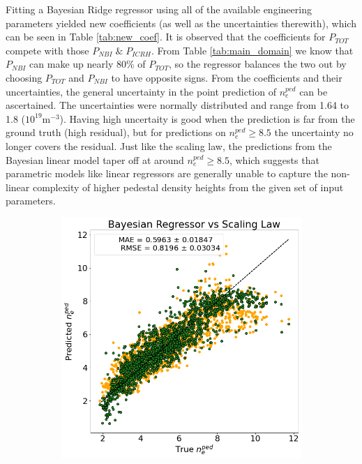 \documentclass[a4paper, twoside, final, 12pt]{article}
\begin{document}
{Fitting a Bayesian Ridge regressor using all of the available engineering parameters yielded new coefficients (as well as the uncertainties therewith), which can be seen in Table \ref{tab:new_coef}. It is observed that the coefficients for $P_{TOT}$ compete with those $P_{NBI} \; \& \; P_{ICRH}$. From Table \ref{tab:main_domain} we know that $P_{NBI}$ can make up nearly 80\% of $P_{TOT}$, so the regressor balances the two out by choosing $P_{TOT}$ and $P_{NBI}$ to have opposite signs.     
From the coefficients and their uncertainties, the general uncertainty in the point prediction of $n_e^{ped}$ can be ascertained. The uncertainties were normally distributed and range from 1.64 to 1.8 ($10^{19}\text{m}^{-3}$). Having high uncertaity is good when the prediction is far from the ground truth (high residual), but for predictions on $n_e^{ped} \geq 8.5$ the uncertainty no longer covers the residual. 
Just like the scaling law, the predictions from the Bayesian linear model taper off at around $n_e^{ped} \geq 8.5$, which suggests that parametric models like linear regressors are generally unable to capture the non-linear complexity of higher pedestal density heights from the given set of input parameters.
\begin{figure}[H]
	\centering
	\begin{subfigure}{0.495\linewidth}
		\centering
		\includegraphics[scale=0.35]{./src/Baysian_regression_predictions}

\end{subfigure}
\end{figure}}
\end{document}
